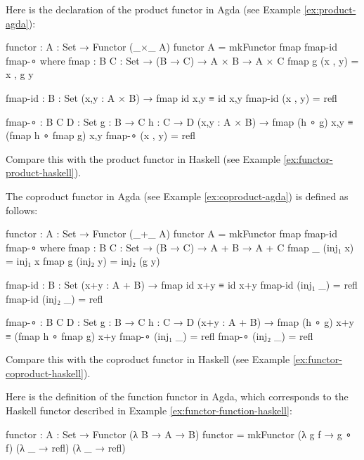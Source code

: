 \begin{example}
  \label{ex:functor-product-agda}

  Here is the declaration of the product functor in Agda (see Example
  \ref{ex:product-agda}):
  \begin{codeagda}
functor : {A : Set} → Functor (_×_ A)
functor {A} = mkFunctor fmap fmap-id fmap-∘
  where
    fmap : {B C : Set} → (B → C) → A × B → A × C
    fmap g (x , y) = x , g y

    fmap-id : {B : Set} (x,y : A × B) → fmap id x,y ≡ id x,y
    fmap-id (x , y) = refl

    fmap-∘ : {B C D : Set} {g : B → C} {h : C → D}
             (x,y : A × B) → fmap (h ∘ g) x,y ≡ (fmap h ∘ fmap g) x,y
    fmap-∘ (x , y) = refl
  \end{codeagda}
  Compare this with the product functor in Haskell (see Example
  \ref{ex:functor-product-haskell}).

\end{example}

\begin{example}
  \label{ex:functor-coproduct-agda}

  The coproduct functor in Agda (see Example \ref{ex:coproduct-agda})
  is defined as follows:
  \begin{codeagda}
functor : {A : Set} → Functor (_+_ A)
functor {A} = mkFunctor fmap fmap-id fmap-∘
  where
    fmap : {B C : Set} → (B → C) → A + B → A + C
    fmap _ (inj₁ x) = inj₁ x
    fmap g (inj₂ y) = inj₂ (g y)

    fmap-id : {B : Set} (x+y : A + B) → fmap id x+y ≡ id x+y
    fmap-id (inj₁ _) = refl
    fmap-id (inj₂ _) = refl

    fmap-∘ : {B C D : Set} {g : B → C} {h : C → D}
             (x+y : A + B) → fmap (h ∘ g) x+y ≡ (fmap h ∘ fmap g) x+y
    fmap-∘ (inj₁ _) = refl
    fmap-∘ (inj₂ _) = refl
  \end{codeagda}
  Compare this with the coproduct functor in Haskell (see Example
  \ref{ex:functor-coproduct-haskell}).

\end{example}

\begin{example}
  \label{ex:functor-function-agda}

  Here is the definition of the function functor in Agda, which
  corresponds to the Haskell functor described in Example
  \ref{ex:functor-function-haskell}:
  \begin{codeagda}
functor : {A : Set} → Functor (λ B → A → B)
functor = mkFunctor (λ g f → g ∘ f) (λ _ → refl) (λ _ → refl)
  \end{codeagda}

\end{example}

